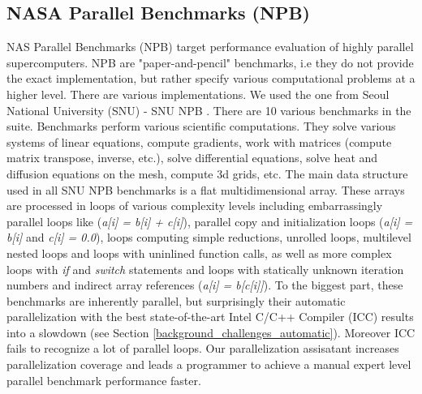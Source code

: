 \subsection{NASA Parallel Benchmarks (NPB)}
\label{ba   ckground_benchmarks_npb}
\quad NAS Parallel Benchmarks (NPB) \cite{nasa-parallel-benchmarks} target performance evaluation of highly parallel supercomputers. NPB are "paper-and-pencil" benchmarks, i.e they do not provide the exact implementation, but rather specify various computational problems at a higher level. There are various implementations. We used the one from Seoul National University (SNU) - SNU NPB \cite{snu-npb-benchmarks}.\newline\null
\quad There are 10 various benchmarks in the suite. Benchmarks perform various scientific computations. They solve various systems of linear equations, compute gradients, work with matrices (compute matrix transpose, inverse, etc.), solve differential equations, solve heat and diffusion equations on the mesh, compute 3d grids, etc. The main data structure used in all SNU NPB benchmarks is a flat multidimensional array. These arrays are processed in loops of various complexity levels including embarrassingly parallel loops like (\textit{a[i] = b[i] + c[i]}), parallel copy and initialization loops (\textit{a[i] = b[i]} and \textit{c[i] = 0.0}), loops computing simple reductions, unrolled loops, multilevel nested loops and loops with uninlined function calls, as well as more complex loops with \textit{if} and \textit{switch} statements and loops with statically unknown iteration numbers and indirect array references (\textit{a[i] = b[c[i]]}).\newline\null
\quad To the biggest part, these benchmarks are inherently parallel, but surprisingly their automatic parallelization with the best state-of-the-art Intel C/C++ Compiler (ICC) \cite{icc-compiler} results into a slowdown (see Section \ref{background_challenges_automatic}). Moreover ICC fails to recognize a lot of parallel loops. Our parallelization assisatant increases parallelization coverage and leads a programmer to achieve a manual expert level parallel benchmark performance faster. 
